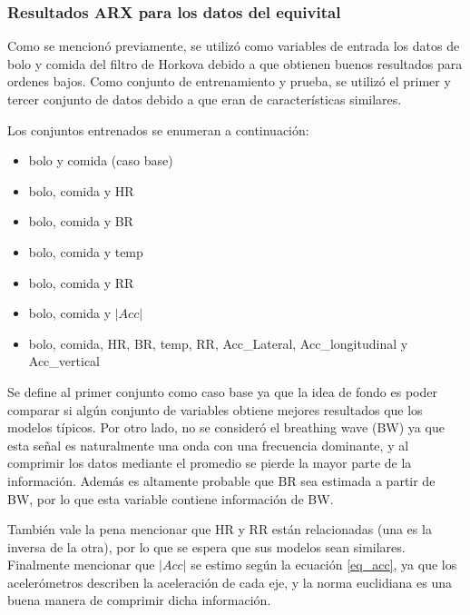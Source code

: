 \subsubsection*{Resultados ARX para los datos del equivital}

Como se mencionó previamente, se utilizó como variables de entrada los datos de bolo y comida del filtro de Horkova debido a que obtienen buenos resultados para ordenes bajos. Como conjunto de entrenamiento y prueba, se utilizó el primer y tercer conjunto de datos debido a que eran de características similares. 

Los conjuntos entrenados se enumeran a continuación:

\begin{itemize}

\item bolo y comida (caso base)

\item bolo, comida y HR

\item bolo, comida y BR

\item bolo, comida y temp

\item bolo, comida y RR

\item bolo, comida y $|Acc|$

\item bolo, comida, HR, BR, temp, RR, Acc\_Lateral, Acc\_longitudinal y Acc\_vertical
\end{itemize}

Se define al primer conjunto como caso base ya que la idea de fondo es poder comparar si algún conjunto de variables obtiene mejores resultados que los modelos típicos. Por otro lado, no se consideró el breathing wave (BW) ya que esta señal es naturalmente una onda con una frecuencia dominante, y al comprimir los datos mediante el promedio se pierde la mayor parte de la información. Además es altamente probable que BR sea estimada a partir de BW, por lo que esta variable contiene información de BW. 

También vale la pena mencionar que HR y RR están relacionadas (una es la inversa de la otra), por lo que se espera que sus modelos sean similares. Finalmente mencionar que $|Acc|$ se estimo según la ecuación \ref{eq_acc}, ya que los acelerómetros describen la aceleración de cada eje, y la norma euclidiana es una buena manera de comprimir dicha información.


